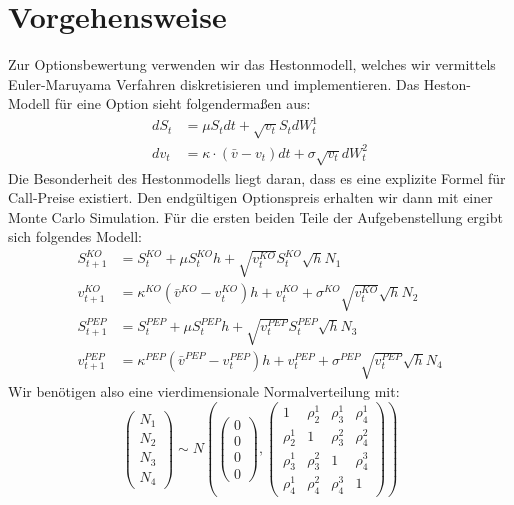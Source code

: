 \documentclass[12pt]{article}
\begin{document}
	\section*{Vorgehensweise}
	Zur Optionsbewertung verwenden wir das Hestonmodell, welches wir vermittels Euler-Maruyama Verfahren diskretisieren und implementieren.
	Das Heston-Modell für eine Option sieht folgendermaßen aus:
	\begin{align*} 
	dS_t &= \mu S_t dt + \sqrt{v_t} S_t dW^1_t \\
	dv_t &= \kappa\cdot(\bar{v}-v_t) dt + \sigma \sqrt{v_t}dW^2_t 
	\end{align*}
	Die Besonderheit des Hestonmodells liegt daran, dass es eine explizite Formel für Call-Preise existiert. Den endgültigen Optionspreis erhalten wir dann mit einer Monte Carlo Simulation. Für die ersten beiden Teile der Aufgebenstellung ergibt sich folgendes Modell:
	\begin{align*}
	S^{KO}_{t+1}&=S^{KO}_{t}+\mu S^{KO}_{t}h+\sqrt{v^{KO}_t}S^{KO}_{t}\sqrt{h}N_1\\
	v^{KO}_{t+1}&=\kappa^{KO}(\bar{v}^{KO}-v^{KO}_t)h+v^{KO}_t+\sigma^{KO}\sqrt{v^{KO}_t}\sqrt{h}N_2\\
	S^{PEP}_{t+1}&=S^{PEP}_{t}+\mu S^{PEP}_{t}h+\sqrt{v^{PEP}_t}S^{PEP}_{t}\sqrt{h}N_3\\
	v^{PEP}_{t+1}&=\kappa^{PEP}(\bar{v}^{PEP}-v^{PEP}_t)h+v^{PEP}_t+\sigma^{PEP}\sqrt{v^{PEP}_t}\sqrt{h}N_4
	\end{align*}
	Wir benötigen also eine vierdimensionale Normalverteilung mit:
	\begin{equation*}
	\left({\begin{array}{c} N_1\\ N_2\\ N_3\\ N_4\end{array}}\right) \sim N\left(\left({\begin{array}{c} 0 \\ 0 \\ 0 \\ 0 \end{array}}\right),\left({\begin{array}{cccc} 1 & \rho^1_2 & \rho^1_3 & \rho^1_4\\ \rho^1_2 & 1 & \rho^2_3 & \rho^2_4 \\ \rho^1_3 & \rho^2_3 & 1 & \rho^3_4 \\ \rho^1_4 & \rho^2_4 & \rho^3_4 & 1 \end{array}}\right)\right)
	\end{equation*}
	
\end{document}
